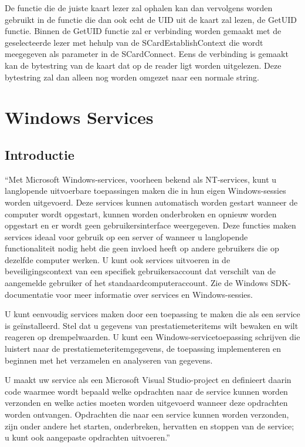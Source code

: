 De functie die de juiste kaart lezer zal ophalen kan dan vervolgens worden gebruikt in de functie die dan ook echt de UID uit de kaart zal lezen, de GetUID functie. Binnen de GetUID functie zal er verbinding worden gemaakt met de geselecteerde lezer met hehulp van de SCardEstablishContext die wordt meegegeven als parameter in de SCardConnect. Eens de verbinding is gemaakt kan de bytestring van de kaart dat op de reader ligt worden uitgelezen. Deze bytestring zal dan alleen nog worden omgezet naar een normale string. 




\section{Windows Services }
\subsection{Introductie}
``Met Microsoft Windows-services, voorheen bekend als NT-services, kunt u langlopende uitvoerbare toepassingen maken die in hun eigen Windows-sessies worden uitgevoerd. Deze services kunnen automatisch worden gestart wanneer de computer wordt opgestart, kunnen worden onderbroken en opnieuw worden opgestart en er wordt geen gebruikersinterface weergegeven. Deze functies maken services ideaal voor gebruik op een server of wanneer u langlopende functionaliteit nodig hebt die geen invloed heeft op andere gebruikers die op dezelfde computer werken. U kunt ook services uitvoeren in de beveiligingscontext van een specifiek gebruikersaccount dat verschilt van de aangemelde gebruiker of het standaardcomputeraccount. Zie de Windows SDK-documentatie voor meer informatie over services en Windows-sessies. 

U kunt eenvoudig services maken door een toepassing te maken die als een service is geïnstalleerd. Stel dat u gegevens van prestatiemeteritems wilt bewaken en wilt reageren op drempelwaarden. U kunt een Windows-servicetoepassing schrijven die luistert naar de prestatiemeteritemgegevens, de toepassing implementeren en beginnen met het verzamelen en analyseren van gegevens. 

U maakt uw service als een Microsoft Visual Studio-project en definieert daarin code waarmee wordt bepaald welke opdrachten naar de service kunnen worden verzonden en welke acties moeten worden uitgevoerd wanneer deze opdrachten worden ontvangen. Opdrachten die naar een service kunnen worden verzonden, zijn onder andere het starten, onderbreken, hervatten en stoppen van de service; u kunt ook aangepaste opdrachten uitvoeren.''\autocite{DevMozService}

